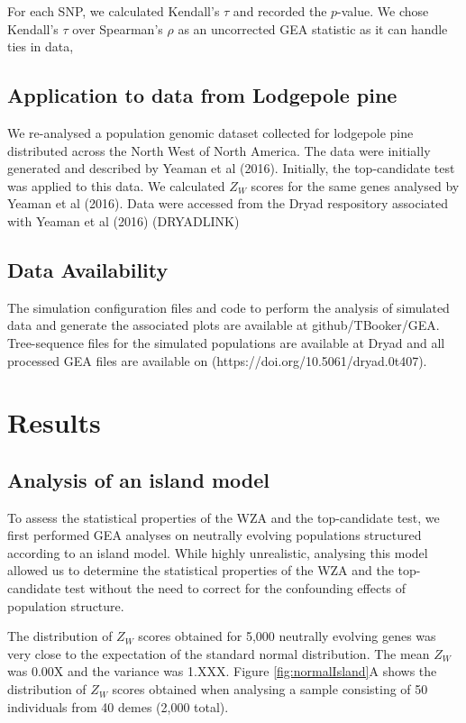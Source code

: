 \documentclass[11pt,twoside,lineno]{GSA_format}
\begin{document}
For each SNP, we calculated Kendall's $\tau$ and recorded the $p$-value. We chose Kendall's $\tau$ over Spearman's $\rho$ as an uncorrected GEA statistic as it can handle ties in data, 


\subsection{Application to data from Lodgepole pine}

We re-analysed a population genomic dataset collected for lodgepole pine distributed across the North West of North America. The data were initially generated and described by Yeaman et al (2016). Initially, the top-candidate test was applied to this data. We calculated $Z_W$ scores for the same genes analysed by Yeaman et al (2016). Data were accessed from the Dryad respository associated with Yeaman et al (2016) (DRYADLINK)

\subsection{Data Availability}

The simulation configuration files and code to perform the analysis of simulated data and generate the associated plots are available at github/TBooker/GEA. Tree-sequence files for the simulated populations are available at Dryad and all processed GEA files are available on (https://doi.org/10.5061/dryad.0t407). 


\section{Results}

\subsection{Analysis of an island model}

To assess the statistical properties of the WZA and the top-candidate test, we first performed GEA analyses on neutrally evolving populations structured according to an island model. While highly unrealistic, analysing this model allowed us to determine the statistical properties of the WZA and the top-candidate test without the need to correct for the confounding effects of population structure. 

The distribution of $Z_W$ scores obtained for 5,000 neutrally evolving genes was very close to the expectation of the standard normal distribution. The mean $Z_W$ was 0.00X and the variance was 1.XXX. Figure \ref{fig:normalIsland}A shows the distribution of $Z_W$ scores obtained when analysing a sample consisting of 50 individuals from 40 demes (2,000 total). 
\end{document}
